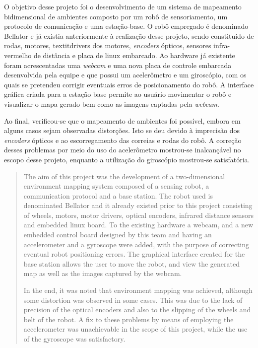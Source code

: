 \documentclass[oneside,a4paper,12pt]{normas-utf-tex}
\begin{document}
\capa
\folhaderosto

\begin{resumo}

O objetivo desse projeto foi o desenvolvimento de um sistema de mapeamento bidimensional de ambientes composto por um robô de sensoriamento, um protocolo de comunicação e uma estação-base. O robô empregado é denominado Bellator e já existia anteriormente à realização desse projeto, sendo constituído de rodas, motores, textit{drivers} dos motores, \textit{encoders} ópticos, sensores infra-vermelho de distância e placa de linux embarcado. Ao hardware já existente foram acrescentadas uma \textit{webcam} e uma nova placa de controle embarcada desenvolvida pela equipe e que possui um acelerômetro e um giroscópio, com os quais se pretendeu corrigir eventuais erros de posicionamento do robô. A interface gráfica criada para a estação base permite ao usuário movimentar o robô e visualizar o mapa gerado bem como as imagens captadas pela \textit{webcam}.

Ao final, verificou-se que o mapeamento de ambientes foi possível, embora em alguns casos sejam observadas distorções. Isto se deu devido à imprecisão dos \textit{encoders} ópticos e ao escorregamento das correias e rodas do robô. A correção desses problemas por meio do uso do acelerômetro mostrou-se inalcançável no escopo desse projeto, enquanto a utilização do giroscópio mostrou-se satisfatória.

\end{resumo}

\begin{abstract}

The aim of this project was the development of a two-dimensional environment mapping system composed of a sensing robot, a communication protocol and a base station. The robot used is denominated Bellator and it already existed prior to this project consisting of wheels, motors, motor drivers, optical encoders, infrared distance sensors and embedded linux board. To the existing hardware a webcam, and a new embedded control board designed by this team and having an accelerometer and a gyroscope were added, with the purpose of correcting eventual robot positioning errors. The graphical interface created for the base station allows the user to move the robot, and view the generated map as well as the images captured by the webcam.

In the end, it was noted that environment mapping was achieved, although some distortion was observed in some cases. This was due to the lack of precision of the optical encoders and also to the slipping of the wheels and belt of the robot. A fix to these problems by means of employing the accelerometer was unachievable in the scope of this project, while the use of the gyroscope was satisfactory.

\end{abstract}
\listadefiguras
\listadetabelas
\sumario











\end{document}
